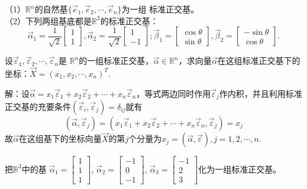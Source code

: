 \begin{eg}
（1）$\mathbb{R}^n$的自然基$\{\vec{e}_1,\vec{e}_2,\cdots,\vec{e}_n\}$为一组
标准正交基。\\
（2）下列两组基底都是$\mathbb{R}^2$的标准正交基：
\begin{equation*}
\vec{\alpha}_1=\frac{1}{\sqrt{2}}\begin{bmatrix}1\\1\end{bmatrix},
\vec{\alpha}_2=\frac{1}{\sqrt{2}}\begin{bmatrix}1\\-1\end{bmatrix};
\vec{\beta}_1=\begin{bmatrix}\cos\theta\\ \sin\theta\end{bmatrix},
\vec{\beta}_2=\begin{bmatrix}-\sin\theta\\ \cos\theta\end{bmatrix}.
\end{equation*}
\end{eg}
\begin{eg}
设$\vec{\varepsilon}_1,\vec{\varepsilon}_2,\cdots,\vec{\varepsilon}_n$是
$\mathbb{R}^n$的一组标准正交基，$\vec{\alpha}\in\mathbb{R}^n$，求向量$\vec{\alpha}$在这组标准正交基下的坐标：$\vec{X}=(x_1,x_2,\cdots,x_n)^T$.\
\end{eg}
解：设$\vec{\alpha}=x_1\vec{\varepsilon}_1+
x_2\vec{\varepsilon}_2+\cdots+x_n\vec{\varepsilon}_n$，等式两边同时作用$\vec{\varepsilon}_j$作内积，并且利用标准正交基的充要条件$(\vec{\varepsilon}_i,\vec{\varepsilon}_j)=\delta_{ij}$就有
\begin{equation*}
(\vec{\alpha},\vec{\varepsilon}_j)=(x_1\vec{\varepsilon}_1+
x_2\vec{\varepsilon}_2+\cdots+x_n\vec{\varepsilon}_n,
\vec{\varepsilon}_j)=x_j
\end{equation*}
故$\vec{\alpha}$在这组基下的坐标向量$\vec{X}$的第$j$个分量为$x_j=(\vec{\alpha},\vec{\varepsilon}),j=1,2,\cdots,n$.
\begin{eg}
把$\mathbb{R}^3$中的基
$\vec{\alpha}_1=\begin{bmatrix}1\\1\\1\end{bmatrix}$,
$\vec{\alpha}_2=\begin{bmatrix}-1\\0\\-1\end{bmatrix}$,
$\vec{\alpha}_3=\begin{bmatrix}-1\\2\\3\end{bmatrix}$化为一组标准正交基。
\end{eg}
